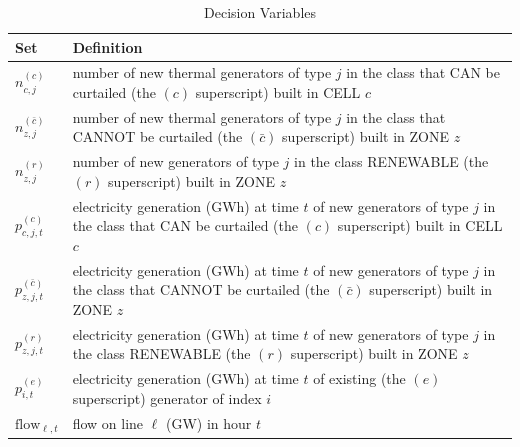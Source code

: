 \documentclass[11pt, oneside]{article}   	%
\newcommand{\flow}{\text{flow}}
\newcommand{\bc}{\bar{c}}
\begin{document}
\begin{table}[H]
   \centering
   \caption{Decision Variables}
   \begin{tabular}{p{1in} p{4in} } %
      \toprule
      \textbf{Set} & \textbf{Definition} \\
      \midrule
      $n^{(c)}_{c, j}$ & number of new thermal generators of type $j$ in the class that CAN be curtailed (the $(c)$ superscript) built in CELL $c$\\
      $n^{(\bc)}_{z, j}$ & number of new thermal generators of type $j$ in the class that CANNOT be curtailed (the $(\bc)$ superscript) built in ZONE $z$\\
      $n^{(r)}_{z, j}$ & number of new generators of type $j$ in the class RENEWABLE (the $(r)$ superscript) built in ZONE $z$\\
      $p^{(c)}_{c, j, t}$ & electricity generation (GWh) at time $t$ of new generators  of type $j$ in the  class that CAN be curtailed (the $(c)$ superscript) built in CELL $c$\\
      $p^{(\bc)}_{z, j, t}$ & electricity generation (GWh) at time $t$ of new generators of type $j$ in the class that CANNOT be curtailed (the $(\bc)$ superscript) built in ZONE $z$\\
      $p^{(r)}_{z, j, t}$ & electricity generation (GWh) at time $t$ of new generators  of type $j$ in the class RENEWABLE (the $(r)$ superscript) built in ZONE $z$\\
      $p^{(e)}_{i, t}$ & electricity generation (GWh) at time $t$ of existing (the $(e)$ superscript) generator of index $i$ \\
      $\flow_{\ell, t}$ & flow on line $\ell$ (GW) in hour $t$\\
%
      \bottomrule
   \end{tabular}
   \label{tab:decision}
\end{table}
\end{document}

